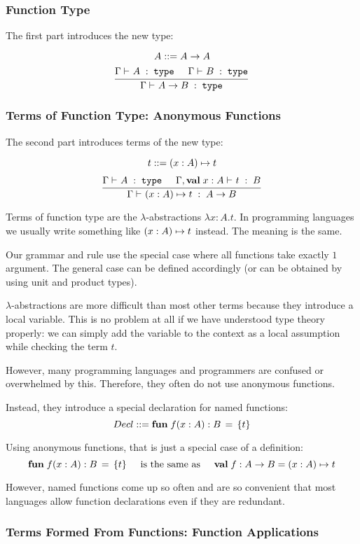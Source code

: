 \subsubsection{Function Type}

The first part introduces the new type:

\[A ::= A\to A\]
\[\cfrac{\Gamma\vdash^{}_{}A\;:\;\mathtt{type}\hspace*{.5cm} \Gamma\vdash^{}_{}B\;:\;\mathtt{type}}{\Gamma\vdash^{}_{}A\to B\;:\;\mathtt{type}}\,\]

\subsubsection{Terms of Function Type: Anonymous Functions}

The second part introduces terms of the new type:

\[t \bbc \alam[A]{x}{t}\]
\[\rul{\oftype{}{\Gamma}{A}{\type}\tb\oftype{}{\Gamma,\aval{x}{A}{}}{t}{B}}{\oftype{}{\Gamma}{\alam[A]{x}{t}}{A\to B}}\]

Terms of function type are the $\lambda$-abstractions $\lambda x:A.t$.
In programming languages we usually write something like $\alam[A]{x}{t}$ instead.
The meaning is the same.

Our grammar and rule use the special case where all functions take exactly $1$ argument.
The general case can be defined accordingly (or can be obtained by using unit and product types).

$\lambda$-abstractions are more difficult than most other terms because they introduce a local variable.
This is no problem at all if we have understood type theory properly: we can simply add the variable to the context as a local assumption while checking the term $t$.
\medskip

However, many programming languages and programmers are confused or overwhelmed by this.
Therefore, they often do not use anonymous functions.

Instead, they introduce a special declaration for named functions:
\[Decl \bbc \afunI[B]{f}{x:A}{t}\]

Using anonymous functions, that is just a special case of a definition:
\[\afunI[B]{f}{x:A}{t} \tb\text{is the same as}\tb \aval{f}{A\to B}{\alam[A]{x}{t}}\]

However, named functions come up so often and are so convenient that most languages allow function declarations even if they are redundant.

\subsubsection{Terms Formed From Functions: Function Applications}

